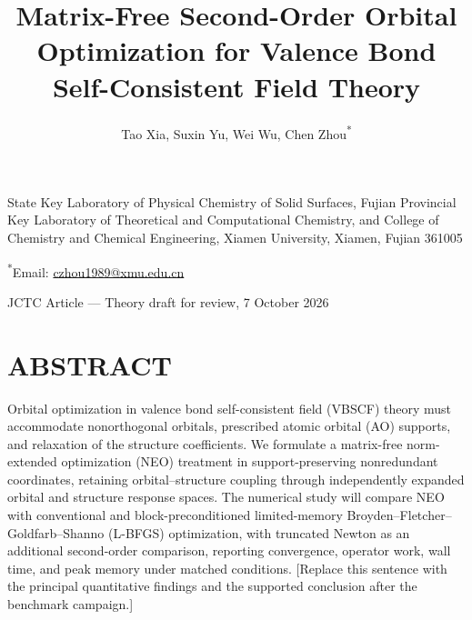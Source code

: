 \documentclass[12pt]{article}
\title{Matrix-Free Second-Order Orbital Optimization for Valence Bond Self-Consistent Field Theory}
\author{Tao Xia, Suxin Yu, Wei Wu, Chen Zhou\textsuperscript{*}}
\date{}
\begin{document}
\maketitle
\begin{center}
\small
State Key Laboratory of Physical Chemistry of Solid Surfaces, Fujian Provincial Key Laboratory of Theoretical and Computational Chemistry, and College of Chemistry and Chemical Engineering, Xiamen University, Xiamen, Fujian 361005

\medskip
\textsuperscript{*}Email: \href{mailto:czhou1989@xmu.edu.cn}{czhou1989@xmu.edu.cn}
\end{center}


JCTC Article --- Theory draft for review, 7 October 2026


\section*{ABSTRACT}

Orbital optimization in valence bond self-consistent field (VBSCF) theory must accommodate nonorthogonal orbitals, prescribed atomic orbital (AO) supports, and relaxation of the structure coefficients. We formulate a matrix-free norm-extended optimization (NEO) treatment in support-preserving nonredundant coordinates, retaining orbital--structure coupling through independently expanded orbital and structure response spaces. The numerical study will compare NEO with conventional and block-preconditioned limited-memory Broyden--Fletcher--Goldfarb--Shanno (L-BFGS) optimization, with truncated Newton as an additional second-order comparison, reporting convergence, operator work, wall time, and peak memory under matched conditions. [Replace this sentence with the principal quantitative findings and the supported conclusion after the benchmark campaign.]
\end{document}
